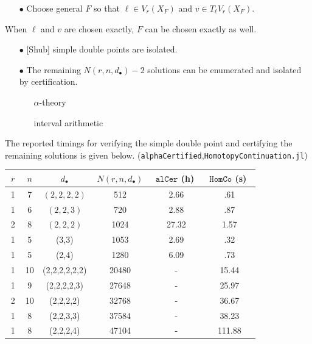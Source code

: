 \documentclass[final]{beamer}
\theoremstyle{thrm}
\newcommand{\headft}[1]{
\begin{center}
\underline{\quad{\LARGE \color{black!50!blue!50}{#1}}\quad}
\end{center}
}
\begin{document}
\begin{frame}
\begin{minipage}[t]{.3\textwidth}
\begin{enumerate}
\item[$\bullet$] Choose general $F$ so that $\ell\in V_r(X_F)$ and $v\in T_\ell V_r(X_F)$.
\end{enumerate}

When $\ell$ and $v$ are chosen exactly, $F$ can be chosen exactly as well.
\begin{enumerate}
\item[$\bullet$] [Shub] simple double points are isolated.

\item[$\bullet$] The remaining $N(r,n,d_\bullet)-2$ solutions can be enumerated and isolated by certification.
\begin{enumerate}
\item[\scalebox{.8}{$\blacksquare$}] \Large $\alpha$-theory \normalsize

\item[\scalebox{.7}{$\blacksquare$}] \Large interval arithmetic
\end{enumerate}
\end{enumerate}

\vspace{.1cm}
\headft{Results and timings}
The reported timings for verifying the simple double point and certifying the remaining solutions is given below. (\texttt{alphaCertified},\texttt{HomotopyContinuation.jl})

\vspace{-.8cm}

\hspace{-.2cm}
\begin{minipage}{.99\textwidth}
\begin{table}[htb]
  \label{Big Fano}
  \def\arraystretch{1.2}
  \begin{tabular}{||c|c|c|c|c|c||}
    \hline
    $~r~$ & $~n~$ & $~d_\bullet~$ & $~N(r,n,d_\bullet)~$ & $~\texttt{alCer}$ (h)~ & $~\texttt{HomCo}$ (s)~\\
    \hline\hline
    1 & 7 & $(2,2,2,2)$ & 512 & 2.66 & .61\\
    \hline
    1 & 6 & $(2,2,3)$ & 720  & 2.88 & .87\\
    \hline
    2 & 8 & $(2,2,2)$ & 1024 & 27.32 & 1.57\\
    \hline
    1 & 5 & (3,3) & 1053 & 2.69 & .32\\
    \hline
    1 & 5 & (2,4) & 1280 & 6.09 & .73\\
    \hline
    1 & 10 & (2,2,2,2,2,2) & 20480 & - & 15.44\\
    \hline
    1 & 9 & (2,2,2,2,3) & 27648 & - & 25.97\\
    \hline
    2 & 10 & (2,2,2,2) & 32768 & - & 36.67\\
    \hline
    1 & 8 & (2,2,3,3) & 37584 & - & 38.23\\
    \hline
    1 & 8 & (2,2,2,4) & 47104 & - & 111.88\\
    \hline
  \end{tabular}
\end{table}
\end{minipage}


\end{minipage}
\end{frame}
\end{document}
